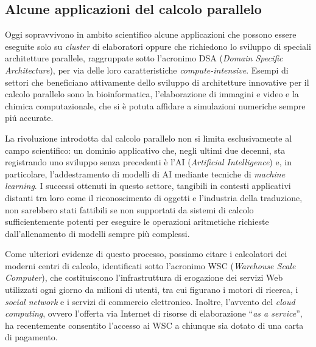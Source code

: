 \subsection{Alcune applicazioni del calcolo parallelo}
Oggi sopravvivono in ambito scientifico alcune applicazioni
che possono essere eseguite
solo su \textit{cluster} di elaboratori oppure che richiedono lo sviluppo di speciali architetture parallele, raggruppate sotto l'acronimo DSA (\textit{Domain Specific Architecture}), per via delle loro caratteristiche \textit{compute-intensive}.\newline
Esempi di settori che beneficiano attivamente dello sviluppo di
architetture innovative per il calcolo parallelo sono la
bioinformatica, l'elaborazione di immagini e video
e la chimica computazionale, che si \`e potuta affidare a simulazioni
numeriche sempre pi\'u accurate.

La rivoluzione introdotta dal calcolo parallelo non si limita esclusivamente al campo scientifico: un dominio applicativo che, negli ultimi due decenni, sta registrando uno sviluppo senza precedenti \`e l'AI (\textit{Artificial Intelligence}) e, in particolare, l'addestramento di modelli di AI mediante tecniche di \textit{machine learning}. \newline
I successi ottenuti in questo settore, tangibili in contesti applicativi distanti tra loro come il riconoscimento di oggetti e l'industria della traduzione, non sarebbero stati fattibili se non supportati da sistemi di calcolo sufficientemente potenti per eseguire le operazioni aritmetiche richieste dall'allenamento di modelli sempre pi\`u complessi.

Come ulteriori evidenze di questo processo, possiamo citare i calcolatori dei moderni centri di calcolo, identificati sotto l'acronimo WSC (\textit{Warehouse Scale Computer}), che costituiscono l'infrastruttura di erogazione dei servizi Web utilizzati ogni giorno da milioni di utenti, tra cui figurano i motori di ricerca, i \textit{social network} e i servizi di commercio elettronico.\newline
Inoltre, l'avvento del \textit{cloud computing}, ovvero l'offerta via Internet di risorse di elaborazione \enquote{\textit{as a service}}, ha recentemente consentito l'accesso ai WSC a chiunque sia dotato di una carta di pagamento.